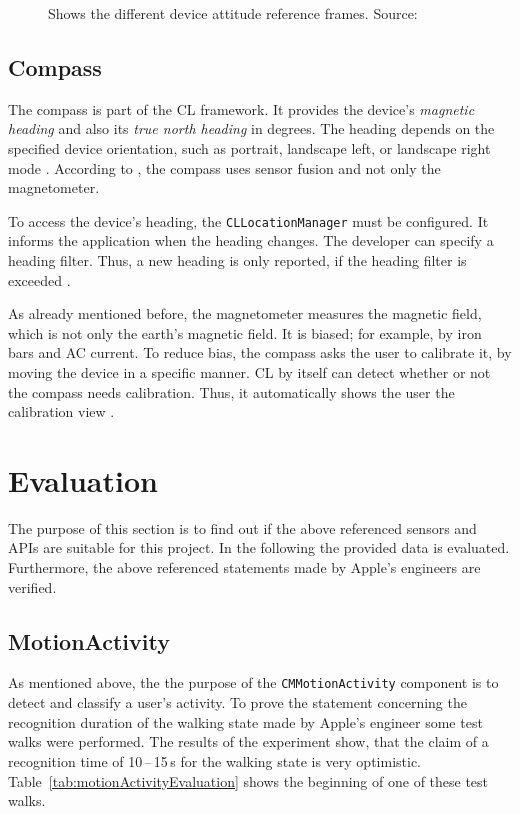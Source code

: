\begin{figure}
      
	\caption{Shows the different device attitude reference frames. Source:~ \citep{apple:wwdc_2012_pham}}
	\label{fig:cm_referenceframes}
\end{figure}


\subsection{Compass}
The compass is part of the \ac{CL} framework. It provides the device's \emph{magnetic heading} and also its \emph{true north heading} in degrees. The heading depends on the specified device orientation, such as portrait, landscape left, or landscape right mode \citep{apple:ios_doc_cl}. According to \citet{apple:wwdc_2012_pham}, the compass uses sensor fusion and not only the magnetometer.

To access the device's heading, the \texttt{CLLocationManager} must be configured. It informs the application when the heading changes. The developer can specify a heading filter. Thus, a new heading is only reported, if the heading filter is exceeded \citep{apple:ios_doc_cl}.

As already mentioned before, the magnetometer measures the magnetic field, which is not only the earth's magnetic field. It is biased; for example, by iron bars and AC current. To reduce bias, the compass asks the user to calibrate it, by moving the device in a specific manner. \ac{CL} by itself can detect whether or not the compass needs calibration. Thus, it automatically shows the user the calibration view \citep{apple:ios_doc_cl}.


\section{Evaluation}\label{sec:sensor_eval}
The purpose of this section is to find out if the above referenced sensors and \acsp{API} are suitable for this project. In the following the provided data is evaluated. Furthermore, the above referenced statements made by Apple's engineers are verified.


\subsection{MotionActivity}
As mentioned above, the the purpose of the \texttt{CMMotionActivity} component is to detect and classify a user's activity. To prove the statement concerning the recognition duration of the walking state made by Apple's engineer \citet{apple:wwdc_2014_pham} some test walks were performed. The results of the experiment show, that the claim of a recognition time of 10\,--\,15\,s for the walking state is very optimistic. Table~\ref{tab:motionActivityEvaluation} shows the beginning of one of these test walks.

